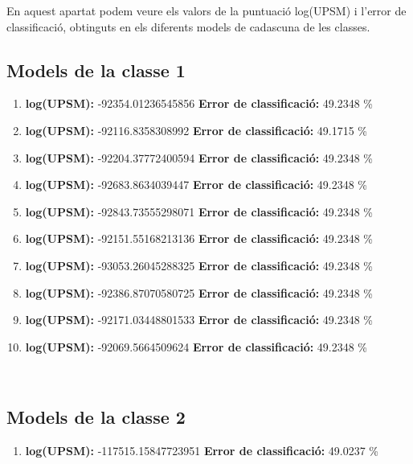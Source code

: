 
En aquest apartat podem veure els valors de la puntuació log(UPSM) i l'error de classificació, obtinguts en els diferents models de cadascuna de les classes. 
\subsection{Models de la classe 1}
\begin{enumerate}
	\item \textbf{log(UPSM):} -92354.01236545856 \textbf{Error de classificació:} 49.2348 \%
	\item \textbf{log(UPSM):} -92116.8358308992 \textbf{Error de classificació:} 49.1715 \%
	\item \textbf{log(UPSM):} -92204.37772400594 \textbf{Error de classificació:} 49.2348 \%
	\item \textbf{log(UPSM):} -92683.8634039447 \textbf{Error de classificació:} 49.2348 \%
	\item \textbf{log(UPSM):} -92843.73555298071 \textbf{Error de classificació:} 49.2348 \%
	\item \textbf{log(UPSM):} -92151.55168213136 \textbf{Error de classificació:} 49.2348 \%
	\item \textbf{log(UPSM):} -93053.26045288325 \textbf{Error de classificació:} 49.2348 \%
	\item \textbf{log(UPSM):} -92386.87070580725 \textbf{Error de classificació:} 49.2348 \%
	\item \textbf{log(UPSM):} -92171.03448801533 \textbf{Error de classificació:} 49.2348 \%
	\item \textbf{log(UPSM):} -92069.5664509624 \textbf{Error de classificació:} 49.2348 \%
\end{enumerate}\\

\subsection{Models de la classe 2}
\begin{enumerate}
	\item \textbf{log(UPSM):} -117515.15847723951 \textbf{Error de classificació:} 49.0237 \%
\end{enumerate}\\


